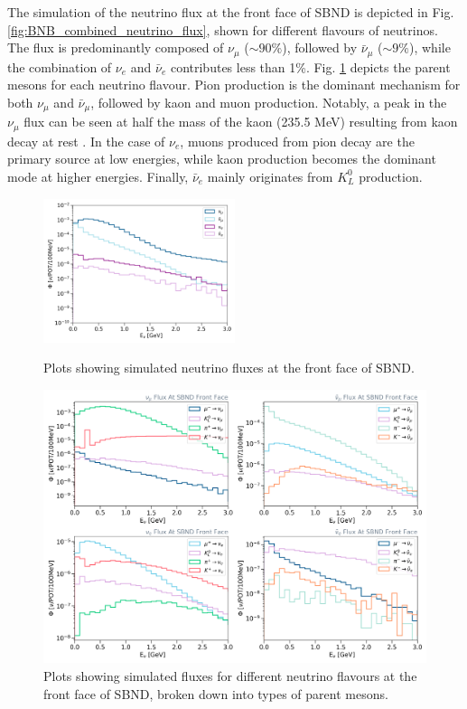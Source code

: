 The simulation of the neutrino flux at the front face of SBND is depicted in Fig. \ref{fig:BNB_combined_neutrino_flux}, shown for different flavours of neutrinos. 
The flux is predominantly composed of $\nu_{\mu}$ ($\sim90\%$), followed by $\bar{\nu}_{\mu}$ ($\sim9\%$), while the combination of $\nu_{e}$ and $\bar{\nu}_{e}$ contributes less than 1\%.
Fig. \ref{fig:BNB_neutrino_flux} depicts the parent mesons for each neutrino flavour.
Pion production is the dominant mechanism for both $\nu_{\mu}$ and $\bar{\nu}_{\mu}$, followed by kaon and muon production. 
Notably, a peak in the $\nu_{\mu}$ flux can be seen at half the mass of the kaon (235.5 MeV) resulting from kaon decay at rest \cite{kaonDecayNu}.
In the case of $\nu_{e}$, muons produced from pion decay are the primary source at low energies, while kaon production becomes the dominant mode at higher energies. 
Finally, $\bar{\nu}_{e}$ mainly originates from $K^{0}_{L}$ production.

\begin{figure}[hp] 
\centering    
\includegraphics[width=0.5\textwidth]{BNB_combined_neutrino_flux}
\caption[Siumluated Neutrino Fluxes at the Front Face of SBND]{
Plots showing simulated neutrino fluxes at the front face of SBND. 
}
\label{fig:BNB_combined_neutrino_flux}
\vspace{0.5cm}
\centering    
\includegraphics[width=1.0\textwidth]{BNB_neutrino_flux}
\caption[Simulated Neutrino Fluxes Of Different Flavours at the Front Face of SBND]{
Plots showing simulated fluxes for different neutrino flavours at the front face of SBND, broken down into types of parent mesons.
}
\label{fig:BNB_neutrino_flux}
\end{figure}

